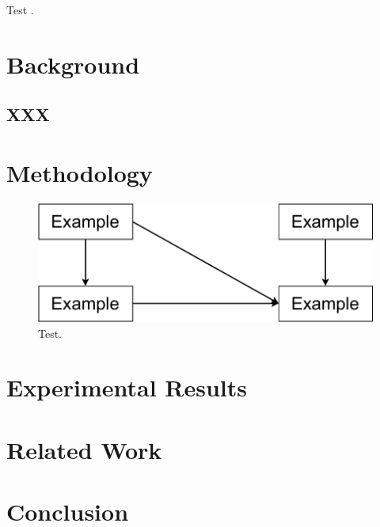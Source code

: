 \documentclass[sigconf]{acmart}
\begin{document}
Test \cite{XXX}.

\section{Background} \label{background}

\subsection{XXX}

\section{Methodology}

\begin{figure}[b]
    \centering
    \includegraphics[width=.75\linewidth]{figures/paper-example.pdf}
    \caption{Test.}
    \Description{}
    \label{fig:overview}
\end{figure}

\section{Experimental Results} \label{evaluation}

\section{Related Work} \label{related_work}


\section{Conclusion} \label{conclusion}



\balance

 
\end{document}
